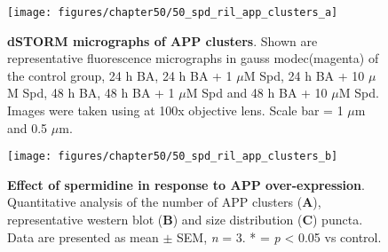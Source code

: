 \begin{landscape}
\begin{figure}[!htbp]
\center
  \texttt{[image: figures/chapter50/50\_spd\_ril\_app\_clusters\_a]}
  \caption[dSTORM micrographs of APP clusters]{\textbf{dSTORM micrographs of APP clusters}. Shown are representative fluorescence micrographs in gauss modec(magenta) of the control group, 24 h BA, 24 h BA + 1 $\mu$M Spd, 24 h BA + 10 $\mu$M Spd, 48 h BA, 48 h BA + 1 $\mu$M Spd and 48 h BA + 10 $\mu$M Spd. Images were taken using at 100x objective lens. Scale bar = 1 $\mu$m and 0.5 $\mu$m.}
  \label{fig:50_spd_ril_app_clusters_a}
\end{figure} 
\end{landscape}

\begin{landscape}
\begin{figure}[!htbp]
\center
  \texttt{[image: figures/chapter50/50\_spd\_ril\_app\_clusters\_b]}
  \caption[Effect of spermidine in response to APP over-expression]{\textbf{Effect of spermidine in response to APP over-expression}. Quantitative analysis of the number of APP clusters (\textbf{A}), representative western blot (\textbf{B}) and size distribution (\textbf{C}) puncta. Data are presented as mean $\pm$ SEM, \textit{n} = 3. * = \textit{p} < 0.05 vs control.}
  \label{fig:50_spd_ril_app_clusters_b}
\end{figure} 
\end{landscape}

